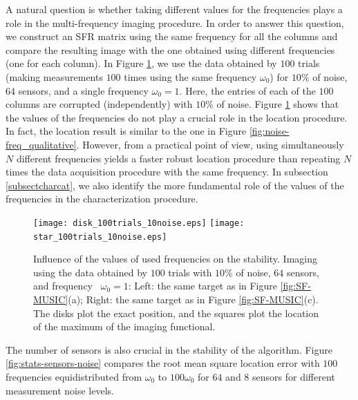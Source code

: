\documentclass[final]{siamltex}
\numberwithin{equation}{section}
\numberwithin{figure}{section}
\numberwithin{table}{section}
\begin{document}
A natural question is whether taking different values for the
frequencies plays a role in the multi-frequency imaging procedure.
In order to answer this question, we construct an SFR matrix using
the same frequency for all the columns and compare the resulting
image with the one obtained using different frequencies (one for
each column). In Figure \ref{fig:noise-freq_100}, we use the data
obtained by $100$ trials (making measurements $100$ times using
the same frequency $\omega_0$) for $10\%$ of noise, $64$ sensors,
and a single frequency $\omega_0=1$. Here, the entries of each of
the $100$ columns are corrupted (independently) with $10\%$ of
noise. Figure \ref{fig:noise-freq_100} shows that the values of
the frequencies do not play a crucial role in the location
procedure. In fact, the location result is similar to the one in
Figure \ref{fig:noise-freq_qualitative}. However, from a practical
point of view, using simultaneously $N$ different frequencies
yields a faster robust location procedure than repeating $N$ times
the data acquisition procedure with the same frequency. In
subsection \ref{subsectcharcat}, we also identify the more
fundamental role of the values of the frequencies in the
characterization procedure.

\begin{figure}
\centering%
\texttt{[image: disk\_100trials\_10noise.eps]} \hspace{0.2cm}
\texttt{[image: star\_100trials\_10noise.eps]}
\caption{\label{fig:noise-freq_100} Influence of the values of
used frequencies on the stability. Imaging using the data obtained
by $100$ trials with $10\%$ of noise, $64$ sensors, and frequency
~$\omega_0=1$:  Left: the same target as in Figure
\ref{fig:SF-MUSIC}(a); Right: the same target as in Figure
\ref{fig:SF-MUSIC}(c). The disks plot the exact position, and the
squares plot the location of the maximum of the imaging
functional.}
\end{figure}



The number of sensors is also crucial in the stability of the
algorithm. Figure \ref{fig:stats-sensors-noise} compares the root
mean square location error with $100$ frequencies equidistributed
from $\omega_0$ to $100 \omega_0$ for $64$ and $8$ sensors for
different measurement noise levels.
\end{document}
